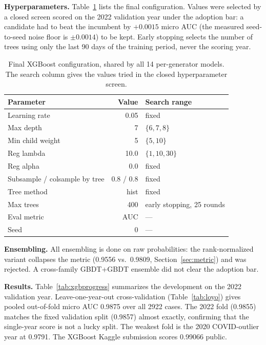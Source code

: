 \documentclass{article}
\begin{document}
\textbf{Hyperparameters.} Table~\ref{tab:xgbparams} lists the final
configuration. Values were selected by a closed screen scored on the 2022
validation year under the adoption bar: a candidate had to beat the
incumbent by $+0.0015$ micro AUC (the measured seed-to-seed noise floor
is $\pm 0.0014$) to be kept. Early stopping selects the number of trees
using only the last 90 days of the training period, never the scoring
year.

\begin{table}[h]
    \centering
    \begin{tabular}{lrl}
        \hline
        Parameter & Value & Search range \\
        \hline
        Learning rate & 0.05 & fixed \\
        Max depth & 7 & $\{6, 7, 8\}$ \\
        Min child weight & 5 & $\{5, 10\}$ \\
        Reg lambda & 10.0 & $\{1, 10, 30\}$ \\
        Reg alpha & 0.0 & fixed \\
        Subsample / colsample by tree & 0.8 / 0.8 & fixed \\
        Tree method & hist & fixed \\
        Max trees & 400 & early stopping, 25 rounds \\
        Eval metric & AUC & --- \\
        Seed & 0 & --- \\
        \hline
    \end{tabular}
    \caption{Final XGBoost configuration, shared by all 14 per-generator
    models. The search column gives the values tried in the closed
    hyperparameter screen.}
    \label{tab:xgbparams}
\end{table}

\textbf{Ensembling.} All ensembling is done on raw probabilities: the
rank-normalized variant collapses the metric (0.9556 vs.\ 0.9809,
Section~\ref{sec:metric}) and was rejected. A cross-family GBDT+GBDT
ensemble did not clear the adoption bar.

\textbf{Results.} Table~\ref{tab:xgbprogress} summarizes the development
on the 2022 validation year. Leave-one-year-out cross-validation
(Table~\ref{tab:loyo}) gives pooled out-of-fold micro AUC 0.9875 over all
2922 cases. The 2022 fold (0.9855) matches the fixed validation split
(0.9857) almost exactly, confirming that the single-year score is not a
lucky split. The weakest fold is the 2020 COVID-outlier year at 0.9791.
The XGBoost Kaggle submission scores 0.99066 public.
\end{document}
